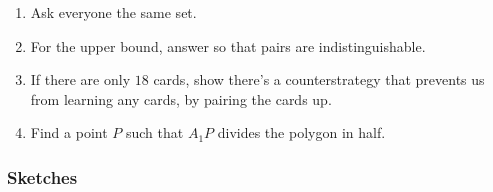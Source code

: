 \documentclass[11pt,paper=letter]{scrartcl}
\begin{document}
\begin{enumerate}
\item \label{h:8} Ask everyone the same set.

\item \label{h:10} For the upper bound, answer so that pairs are indistinguishable.

\item \label{h:17} If there are only $18$ cards, show there's a counterstrategy that prevents us from learning any cards, by pairing the cards up.

\item \label{h:6} Find a point $P$ such that $A_1P$ divides the polygon in half.

\end{enumerate}

\newpage

\subsubsection*{Sketches}
\end{document}

